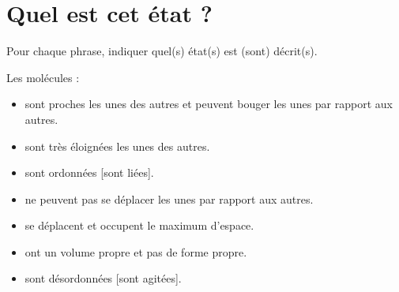 
\section{Quel est cet état ?}\label{ex:etat}



\begin{questions}
	\question[] Pour chaque phrase, indiquer quel(s) état(s) est (sont) décrit(s).
	
	Les molécules :\\
	\begin{itemize}
		\item sont proches les unes des autres et peuvent bouger les unes par rapport aux autres.
		
		\item sont très éloignées les unes des autres.
		
		\item sont ordonnées [sont liées].
		
		\item ne peuvent pas se déplacer les unes par rapport aux autres.
		
		\item se déplacent et occupent le maximum d'espace.
		
		\item ont un volume propre et pas de forme propre.
		
		\item sont désordonnées [sont agitées].
	\end{itemize}
	
\end{questions}
